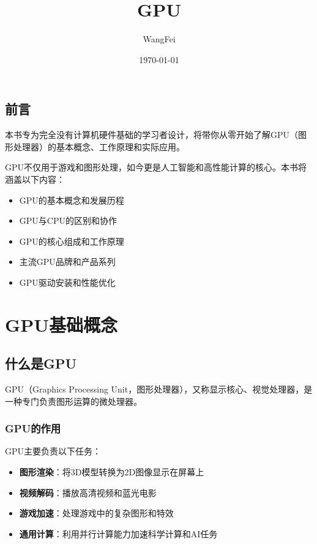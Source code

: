 \documentclass[12pt,UTF8]{ctexbook}
\title{\heiti\zihao{0} GPU}
\author{WangFei}
\date{\today}
\begin{document}
\maketitle
\tableofcontents

\frontmatter
\chapter{前言}

本书专为完全没有计算机硬件基础的学习者设计，将带你从零开始了解GPU（图形处理器）的基本概念、工作原理和实际应用。

GPU不仅用于游戏和图形处理，如今更是人工智能和高性能计算的核心。本书将涵盖以下内容：
\begin{itemize}
    \item GPU的基本概念和发展历程
    \item GPU与CPU的区别和协作
    \item GPU的核心组成和工作原理
    \item 主流GPU品牌和产品系列
    \item GPU驱动安装和性能优化
\end{itemize}

\mainmatter

\part{GPU基础概念}

\chapter{什么是GPU}

GPU（Graphics Processing Unit，图形处理器），又称显示核心、视觉处理器，是一种专门负责图形运算的微处理器。

\section{GPU的作用}

GPU主要负责以下任务：

\begin{itemize}[leftmargin=2em]
    \item \textbf{图形渲染}：将3D模型转换为2D图像显示在屏幕上
    \item \textbf{视频解码}：播放高清视频和蓝光电影
    \item \textbf{游戏加速}：处理游戏中的复杂图形和特效
    \item \textbf{通用计算}：利用并行计算能力加速科学计算和AI任务
\end{itemize}
\end{document}
